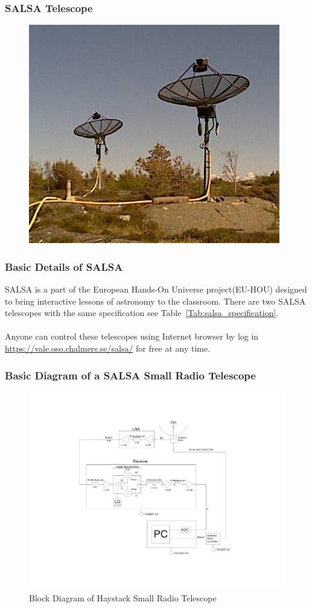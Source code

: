 \documentclass{beamer}
\begin{document}
\begin{frame}
\frametitle{SALSA Telescope}
\begin{figure}
\includegraphics[width=0.8\linewidth]{salsa.png}
\end{figure}
\end{frame}


\begin{frame}
\frametitle{Basic Details of SALSA}
SALSA is a part of the European Hands-On Universe project(EU-HOU)\cite{Ferlet2006} designed to bring interactive lessons of astronomy to the classroom\cite{SALSAS2018}. There are two SALSA telescopes with the same specification see Table~\ref{Tab:salsa_specification}\cite{ThomasBensby2017}.\\~\\ 
Anyone can control these telescopes using Internet browser by log in \url{https://vale.oso.chalmers.se/salsa/} for free at any time.
\end{frame}

\begin{frame}
\frametitle{Basic Diagram of a SALSA Small Radio Telescope}
\begin{figure}
\caption{Block Diagram of Haystack Small Radio Telescope\cite{DustinJohnson2012}}
\includegraphics[width=0.8\linewidth]{block}
\end{figure}
\end{frame}
\end{document}
